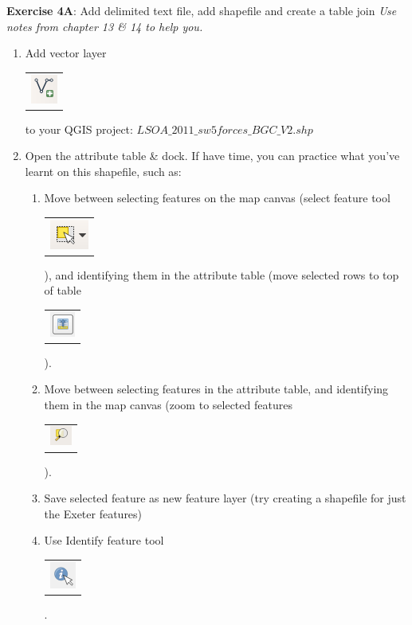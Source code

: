 \documentclass{article}
\begin{document}
\textbf{Exercise 4A}: Add delimited text file, add shapefile and create a table join \emph{Use notes from chapter 13 \& 14 to help you.}
\begin{enumerate}
	\item Add vector layer
		\begin{tabular}{@{}c@{}}\includegraphics[width=3ex]{images/add_vector_layer_icon.png}\end{tabular}
		 to your QGIS project: $LSOA\_2011\_sw5forces\_BGC\_V2.shp$
	\item Open the attribute table \& dock. If have time, you can practice what you've learnt on this shapefile, such as:
\begin{enumerate}
		\item Move between selecting features on the map canvas (select feature tool
		\begin{tabular}{@{}c@{}}\includegraphics[width=3ex]{images/select_features_icon.png}\end{tabular}		
		), and identifying them in the attribute table (move selected rows to top of table
		\begin{tabular}{@{}c@{}}\includegraphics[width=3ex]{images/move_selection_to_top_icon.png}\end{tabular}). 
		\item Move between selecting features in the attribute table, and identifying them in the map canvas (zoom to selected features
		\begin{tabular}{@{}c@{}}\includegraphics[width=3ex]{images/zoom_map_to_selection_icon.png}\end{tabular}). 
		\item Save selected feature as new feature layer (try creating a shapefile for just the Exeter features)
		\item Use Identify feature tool
		\begin{tabular}{@{}c@{}}\includegraphics[width=3ex]{images/identify_feature_icon.png}\end{tabular}. 

\end{enumerate}
\end{enumerate}
\end{document}
